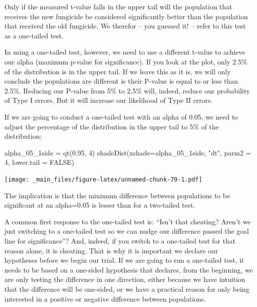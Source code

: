 \documentclass[
]{book}
\newenvironment{Shaded}{\begin{snugshade}}{\end{snugshade}}
\newcommand{\AttributeTok}[1]{\textcolor[rgb]{0.77,0.63,0.00}{#1}}
\newcommand{\ConstantTok}[1]{\textcolor[rgb]{0.00,0.00,0.00}{#1}}
\newcommand{\DecValTok}[1]{\textcolor[rgb]{0.00,0.00,0.81}{#1}}
\newcommand{\FloatTok}[1]{\textcolor[rgb]{0.00,0.00,0.81}{#1}}
\newcommand{\FunctionTok}[1]{\textcolor[rgb]{0.00,0.00,0.00}{#1}}
\newcommand{\NormalTok}[1]{#1}
\newcommand{\OtherTok}[1]{\textcolor[rgb]{0.56,0.35,0.01}{#1}}
\newcommand{\StringTok}[1]{\textcolor[rgb]{0.31,0.60,0.02}{#1}}
\begin{document}
Only if the measured t-value falls in the upper tail will the population that receives the new fungicide be considered significantly better than the population that received the old fungicide. We therefor -- you guessed it! -- refer to this test as a one-tailed test.

In using a one-tailed test, however, we need to use a different t-value to achieve our alpha (maximum p-value for significance). If you look at the plot, only 2.5\% of the distribution is in the upper tail. If we leave this as it is, we will only conclude the populations are different is their P-value is equal to or less than 2.5\%. Reducing our P-value from 5\% to 2.5\% will, indeed, reduce our probability of Type I errors. But it will increase our likelihood of Type II errors.

If we are going to conduct a one-tailed test with an alpha of 0.05, we need to adjust the percentage of the distribution in the upper tail to 5\% of the distribution:

\begin{Shaded}
\begin{Highlighting}[]
\NormalTok{alpha\_05\_1side }\OtherTok{=} \FunctionTok{qt}\NormalTok{(}\FloatTok{0.95}\NormalTok{, }\DecValTok{4}\NormalTok{)}
\FunctionTok{shadeDist}\NormalTok{(}\AttributeTok{xshade=}\NormalTok{alpha\_05\_1side, }\StringTok{"dt"}\NormalTok{, }\AttributeTok{parm2 =} \DecValTok{4}\NormalTok{, }\AttributeTok{lower.tail =} \ConstantTok{FALSE}\NormalTok{)}
\end{Highlighting}
\end{Shaded}

\texttt{[image: \_main\_files/figure-latex/unnamed-chunk-79-1.pdf]}

The implication is that the minimum difference between populations to be significant at an alpha=0.05 is lesser than for a two-tailed test.

A common first response to the one-tailed test is: ``Isn't that cheating? Aren't we just switching to a one-tailed test so we can nudge our difference passed the goal line for significance''? And, indeed, if you switch to a one-tailed test for that reason alone, it is cheating. That is why it is important we declare our hypotheses before we begin our trial. If we are going to run a one-tailed test, it needs to be based on a one-sided hypothesis that declares, from the beginning, we are only testing the difference in one direction, either because we have intuition that the difference will be one-sided, or we have a practical reason for only being interested in a positive or negative difference between populations.
\end{document}
